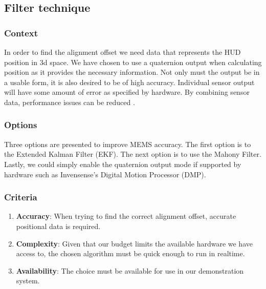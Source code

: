 \subsection{Filter technique}
\subsubsection{Context}
In order to find the alignment offset we need data that represents the HUD position in 3d space.
We have chosen to use a quaternion output when calculating position as it provides the necessary information.
Not only must the output be in a usable form, it is also desired to be of high accuracy.
Individual sensor output will have some amount of error as specified by hardware.
By combining sensor data, performance issues can be reduced \cite{MOUSER}. \\

\subsubsection{Options}
Three options are presented to improve MEMS accuracy.
The first option is to the Extended Kalman Filter (EKF).
The next option is to use the Mahony Filter.
Lastly, we could simply enable the quaternion output mode if supported by hardware such as Invensense’s Digital Motion Processor (DMP).\\


\subsubsection{Criteria}
\begin{enumerate}
	\item \textbf{Accuracy}: When trying to find the correct alignment offset, accurate positional data is required.
	\item \textbf{Complexity}: Given that our budget limits the available hardware we have access to, the chosen algorithm must be quick enough to run in realtime.
	\item \textbf{Availability}: The choice must be available for use in our demonstration system. \\
\end{enumerate}

\newpage
